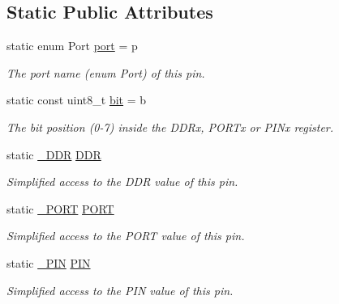 \subsection*{Static Public Attributes}
\begin{DoxyCompactItemize}
\item 
static enum Port \hyperlink{structALIBVR__NAMESPACE__PREFIXports_1_1Pin_ac2c40092b7e6e5a082e9c67590d444c1}{port} = p\hypertarget{structALIBVR__NAMESPACE__PREFIXports_1_1Pin_ac2c40092b7e6e5a082e9c67590d444c1}{}\label{structALIBVR__NAMESPACE__PREFIXports_1_1Pin_ac2c40092b7e6e5a082e9c67590d444c1}

\begin{DoxyCompactList}\small\item\em The port name (enum Port) of this pin. \end{DoxyCompactList}\item 
static const uint8\+\_\+t \hyperlink{structALIBVR__NAMESPACE__PREFIXports_1_1Pin_a317c9e776458f59d7abe06da3a860469}{bit} = b\hypertarget{structALIBVR__NAMESPACE__PREFIXports_1_1Pin_a317c9e776458f59d7abe06da3a860469}{}\label{structALIBVR__NAMESPACE__PREFIXports_1_1Pin_a317c9e776458f59d7abe06da3a860469}

\begin{DoxyCompactList}\small\item\em The bit position (0-\/7) inside the D\+D\+Rx, P\+O\+R\+Tx or P\+I\+Nx register. \end{DoxyCompactList}\item 
static \hyperlink{structALIBVR__NAMESPACE__PREFIXports_1_1__Io}{\+\_\+\+D\+DR} \hyperlink{structALIBVR__NAMESPACE__PREFIXports_1_1Pin_a7a8fd2de2412fd6b900c5f65249ac77b}{D\+DR}
\begin{DoxyCompactList}\small\item\em Simplified access to the D\+DR value of this pin. \end{DoxyCompactList}\item 
static \hyperlink{structALIBVR__NAMESPACE__PREFIXports_1_1__Io}{\+\_\+\+P\+O\+RT} \hyperlink{structALIBVR__NAMESPACE__PREFIXports_1_1Pin_a0d296d2ad6858263ef7aff31969a0b2d}{P\+O\+RT}
\begin{DoxyCompactList}\small\item\em Simplified access to the P\+O\+RT value of this pin. \end{DoxyCompactList}\item 
static \hyperlink{structALIBVR__NAMESPACE__PREFIXports_1_1__Io}{\+\_\+\+P\+IN} \hyperlink{structALIBVR__NAMESPACE__PREFIXports_1_1Pin_a76f4ad486feabcd5abf2f3d9afa24650}{P\+IN}
\begin{DoxyCompactList}\small\item\em Simplified access to the P\+IN value of this pin. \end{DoxyCompactList}\end{DoxyCompactItemize}


